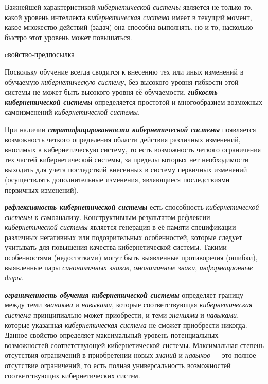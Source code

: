 Важнейшей характеристикой \textit{кибернетической системы} является не только то, какой уровень интеллекта \textit{кибернетическая система} имеет в текущий момент, какое множество действий (задач) она способна выполнять, но и то, насколько быстро этот уровень может повышаться.

\begin{SCn}
\begin{scnrelfromlist}{cвойство-предпосылка}
\end{scnrelfromlist}
\end{SCn}

Поскольку обучение всегда сводится к внесению тех или иных изменений в обучаемую \textit{кибернетическую систему}, без высокого уровня гибкости этой системы не может быть высокого уровня её обучаемости.
\textbf{\textit{гибкость кибернетической системы}} определяется простотой и многообразием возможных самоизменений \textit{кибернетической системы}.

При наличии \textbf{\textit{стратифицированности кибернетической системы}} появляется возможность четкого определения области действия различных изменений, вносимых в кибернетическую систему, то есть возможность четкого ограничения тех частей кибернетической системы, за пределы которых нет необходимости выходить для учета последствий внесенных в систему первичных изменений (осуществлять дополнительные изменения, являющиеся последствиями первичных изменений).

\textbf{\textit{рефлексивность кибернетической системы}} есть способность \textit{кибернетической системы} к самоанализу.
Конструктивным результатом рефлексии \textit{кибернетической системы} является генерация в её памяти спецификации различных негативных или подозрительных особенностей, которые следует учитывать для повышения качества кибернетической системы. Такими особенностями (недостатками) могут быть выявленные противоречия (ошибки), выявленные пары \textit{синонимичных знаков}, \textit{омонимичные знаки}, \textit{информационные дыры}.

\textbf{\textit{ограниченность обучения кибернетической системы}} определяет границу между теми \textit{знаниями} и \textit{навыками}, которые соответствующая \textit{кибернетическая система} принципиально может приобрести, и теми \textit{знаниями} и \textit{навыками}, которые указанная \textit{кибернетическая система} не сможет приобрести никогда. Данное свойство определяет максимальный уровень потенциальных возможностей соответствующей кибернетической системы. Максимальная степень отсутствия ограничений в приобретении новых \textit{знаний} и \textit{навыков} --- это полное отсутствие ограничений, то есть полная универсальность возможностей соответствующих кибернетических систем.

